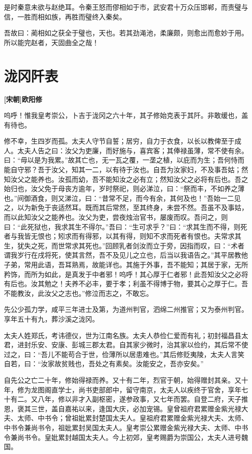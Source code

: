 \documentclass[UTF8,titlepage,oneside]{ctexbook}
\begin{document}
是时秦意未欲与赵绝耳。令秦王怒而僇相如于市，武安君十万众压邯郸，而责璧与信，一胜而相如族，再胜而璧终入秦矣。

吾故曰：蔺相如之获全于璧也，天也。若其劲渑池，柔廉颇，则愈出而愈妙于用。所以能完赵者，天固曲全之哉！


\chapter*{泷冈阡表}
\begin{center}
	\textbf{[宋朝]欧阳修}
\end{center}


呜呼！惟我皇考崇公，卜吉于泷冈之六十年，其子修始克表于其阡。非敢缓也，盖有待也。


修不幸，生四岁而孤。太夫人守节自誓；居穷，自力于衣食，以长以教俾至于成人。太夫人告之曰：汝父为吏廉，而好施与，喜宾客；其俸禄虽薄，常不使有余。曰：“毋以是为我累。”故其亡也，无一瓦之覆，一垄之植，以庇而为生；吾何恃而能自守邪？吾于汝父，知其一二，以有待于汝也。自吾为汝家妇，不及事吾姑；然知汝父之能养也。汝孤而幼，吾不能知汝之必有立；然知汝父之必将有后也。吾之始归也，汝父免于母丧方逾年，岁时祭祀，则必涕泣，曰：“祭而丰，不如养之薄也。”间御酒食，则又涕泣，曰：“昔常不足，而今有余，其何及也！”吾始一二见之，以为新免于丧适然耳。既而其后常然，至其终身，未尝不然。吾虽不及事姑，而以此知汝父之能养也。汝父为吏，尝夜烛治官书，屡废而叹。吾问之，则曰：“此死狱也，我求其生不得尔。”吾曰：“生可求乎？”曰：“求其生而不得，则死者与我皆无恨也；矧求而有得邪，以其有得，则知不求而死者有恨也。夫常求其生，犹失之死，而世常求其死也。”回顾乳者剑汝而立于旁，因指而叹，曰：“术者谓我岁行在戌将死，使其言然，吾不及见儿之立也，后当以我语告之。”其平居教他子弟，常用此语，吾耳熟焉，故能详也。其施于外事，吾不能知；其居于家，无所矜饰，而所为如此，是真发于中者邪！呜呼！其心厚于仁者邪！此吾知汝父之必将有后也。汝其勉之！夫养不必丰，要于孝；利虽不得博于物，要其心之厚于仁。吾不能教汝，此汝父之志也。”修泣而志之，不敢忘。


先公少孤力学，咸平三年进士及第，为道州判官，泗绵二州推官；又为泰州判官。享年五十有九，葬沙溪之泷冈。


太夫人姓郑氏，考讳德仪，世为江南名族。太夫人恭俭仁爱而有礼；初封福昌县太君，进封乐安、安康、彭城三郡太君。自其家少微时，治其家以俭约，其后常不使过之，曰：“吾儿不能苟合于世，俭薄所以居患难也。”其后修贬夷陵，太夫人言笑自若，曰：“汝家故贫贱也，吾处之有素矣。汝能安之，吾亦安矣。”


自先公之亡二十年，修始得禄而养。又十有二年，烈官于朝，始得赠封其亲。又十年，修为龙图阁直学士，尚书吏部郎中，留守南京，太夫人以疾终于官舍，享年七十有二。又八年，修以非才入副枢密，遂参政事，又七年而罢。自登二府，天子推恩，褒其三世，盖自嘉祐以来，逢国大庆，必加宠锡。皇曾祖府君累赠金紫光禄大夫、太师、中书令；曾祖妣累封楚国太夫人。皇祖府君累赠金紫光禄大夫、太师、中书令兼尚书令，祖妣累封吴国太夫人。皇考崇公累赠金紫光禄大夫、太师、中书令兼尚书令。皇妣累封越国太夫人。今上初郊，皇考赐爵为崇国公，太夫人进号魏国。
\end{document}
